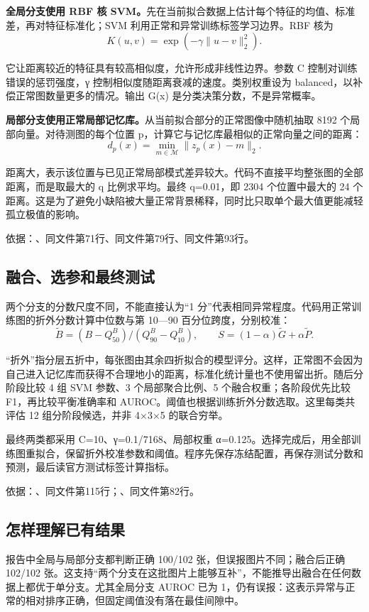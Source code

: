 \documentclass[UTF8,fontset=windows,11pt,a4paper]{ctexart}
\begin{document}
\textbf{全局分支使用 RBF 核 SVM。}先在当前拟合数据上估计每个特征的均值、标准差，再对特征标准化；SVM 利用正常和异常训练标签学习边界。RBF 核为
\[
K(u,v)=\exp(-\gamma\|u-v\|_2^2).
\]

它让距离较近的特征具有较高相似度，允许形成非线性边界。参数 C 控制对训练错误的惩罚强度，γ 控制相似度随距离衰减的速度。类别权重设为 balanced，以补偿正常图数量更多的情况。输出 G(x) 是分类决策分数，不是异常概率。

\textbf{局部分支使用正常局部记忆库。}从当前拟合部分的正常图像中随机抽取 8192 个局部向量。对待测图的每个位置 p，计算它与记忆库最相似的正常向量之间的距离：
\[
d_p(x)=\min_{m\in\mathcal M}\|z_p(x)-m\|_2.
\]

距离大，表示该位置与已见正常局部模式差异较大。代码不直接平均整张图的全部距离，而是取最大的 q 比例求平均。最终 q=0.01，即 2304 个位置中最大的 24 个距离。这是为了避免小缺陷被大量正常背景稀释，同时比只取单个最大值更能减轻孤立极值的影响。

依据：、同文件第71行、同文件第79行、同文件第93行。

\subsection{融合、选参和最终测试}

两个分支的分数尺度不同，不能直接认为“1 分”代表相同异常程度。代码用正常训练图的折外分数计算中位数与第 10—90 百分位跨度，分别校准：
\[
\widetilde B=(B-Q_{50}^B)/(Q_{90}^B-Q_{10}^B),\qquad
S=(1-\alpha)\widetilde G+\alpha\widetilde P.
\]

“折外”指分层五折中，每张图由其余四折拟合的模型评分。这样，正常图不会因为自己进入记忆库而获得不合理地小的距离，标准化统计量也不使用留出折。随后分阶段比较 4 组 SVM 参数、3 个局部聚合比例、5 个融合权重；各阶段优先比较 F1，再比较平衡准确率和 AUROC。阈值也根据训练折外分数选取。这里每类共评估 12 组分阶段候选，并非 4×3×5 的联合穷举。

最终两类都采用 C=10、γ=0.1/7168、局部权重 α=0.125。选择完成后，用全部训练图重拟合，保留折外校准参数和阈值。程序先保存冻结配置，再保存测试分数和预测，最后读官方测试标签计算指标。

依据：、同文件第115行；、同文件第82行。

\subsection{怎样理解已有结果}

报告中全局与局部分支都判断正确 100/102 张，但误报图片不同；融合后正确 102/102 张。这支持“两个分支在这批图片上能够互补”，不能推导出融合在任何数据上都优于单分支。尤其全局分支 AUROC 已为 1，仍有误报：这表示异常与正常的相对排序正确，但固定阈值没有落在最佳间隙中。
\end{document}
